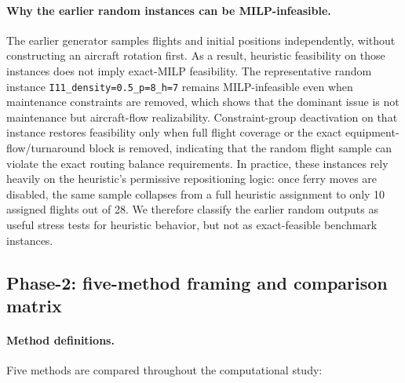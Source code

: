 \paragraph{Why the earlier random instances can be MILP-infeasible.}
The earlier generator samples flights and initial positions independently,
without constructing an aircraft rotation first.  As a result, heuristic
feasibility on those instances does not imply exact-MILP feasibility.  The
representative random instance \texttt{I11\_density=0.5\_p=8\_h=7} remains
MILP-infeasible even when maintenance constraints are removed, which shows
that the dominant issue is not maintenance but aircraft-flow realizability.
Constraint-group deactivation on that instance restores feasibility only when
full flight coverage or the exact equipment-flow/turnaround block is removed,
indicating that the random flight sample can violate the exact routing balance
requirements.  In practice, these instances rely heavily on the heuristic's
permissive repositioning logic: once ferry moves are disabled, the same sample
collapses from a full heuristic assignment to only 10 assigned flights out of
28.  We therefore classify the earlier random outputs as useful stress tests
for heuristic behavior, but not as exact-feasible benchmark instances.

\subsection{Phase-2: five-method framing and comparison matrix}
\label{subsec:phase2_framing}

\paragraph{Method definitions.}
Five methods are compared throughout the computational study:

